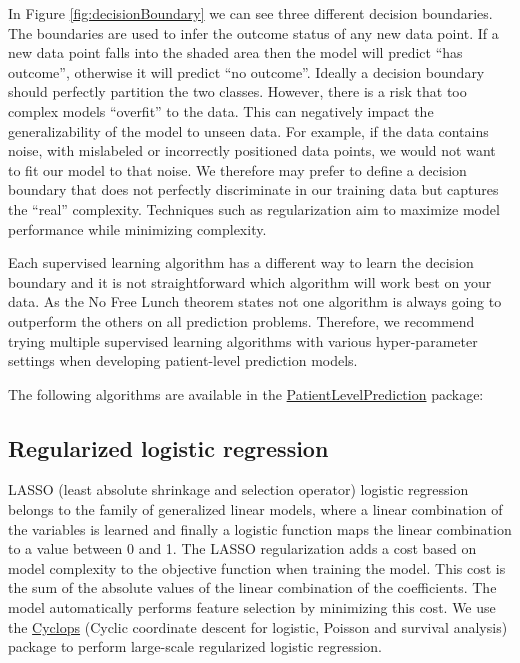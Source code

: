 \documentclass[11pt]{book}
\theoremstyle{definition}
\theoremstyle{definition}
\theoremstyle{definition}
\theoremstyle{remark}
\begin{document}
In Figure \ref{fig:decisionBoundary} we can see three different decision boundaries. The boundaries are used to infer the outcome status of any new data point. If a new data point falls into the shaded area then the model will predict ``has outcome'', otherwise it will predict ``no outcome''. Ideally a decision boundary should perfectly partition the two classes. However, there is a risk that too complex models ``overfit'' to the data. This can negatively impact the generalizability of the model to unseen data. For example, if the data contains noise, with mislabeled or incorrectly positioned data points, we would not want to fit our model to that noise. We therefore may prefer to define a decision boundary that does not perfectly discriminate in our training data but captures the ``real'' complexity. Techniques such as regularization aim to maximize model performance while minimizing complexity.

Each supervised learning algorithm has a different way to learn the decision boundary and it is not straightforward which algorithm will work best on your data. As the No Free Lunch theorem states not one algorithm is always going to outperform the others on all prediction problems. Therefore, we recommend trying multiple supervised learning algorithms with various hyper-parameter settings when developing patient-level prediction models.

The following algorithms are available in the \href{https://ohdsi.github.io/PatientLevelPrediction/}{PatientLevelPrediction} package:

\hypertarget{regularized-logistic-regression}{%
\subsection{Regularized logistic regression}\label{regularized-logistic-regression}}

LASSO (least absolute shrinkage and selection operator) logistic regression belongs to the family of generalized linear models, where a linear combination of the variables is learned and finally a logistic function maps the linear combination to a value between 0 and 1. The LASSO regularization adds a cost based on model complexity to the objective function when training the model. This cost is the sum of the absolute values of the linear combination of the coefficients. The model automatically performs feature selection by minimizing this cost. We use the \href{https://ohdsi.github.io/Cyclops/}{Cyclops} (Cyclic coordinate descent for logistic, Poisson and survival analysis) package to perform large-scale regularized logistic regression.    
\end{document}
